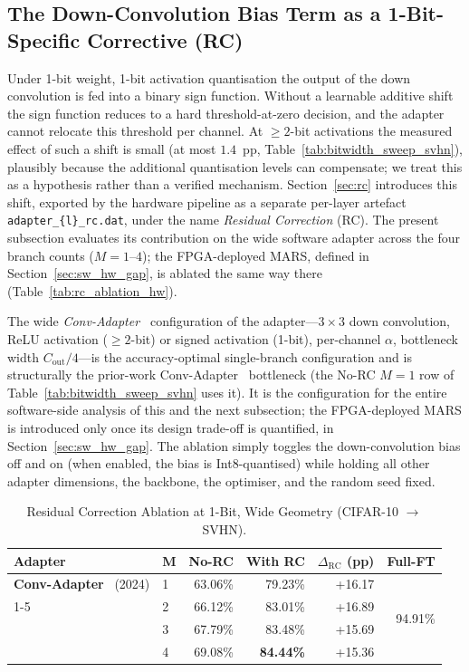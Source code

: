 \documentclass[12pt, a4paper]{report}
\numberwithin{equation}{chapter}
\numberwithin{figure}{chapter}
\numberwithin{table}{chapter}
\numberwithin{algorithm}{chapter}
\begin{document}
\subsection{The Down-Convolution Bias Term as a 1-Bit-Specific Corrective (RC)}
\label{sec:rc_ablation_svhn}

Under 1-bit weight, 1-bit activation quantisation the output of the down convolution is fed into a binary sign function. Without a learnable additive shift the sign function reduces to a hard threshold-at-zero decision, and the adapter cannot relocate this threshold per channel. At $\geq 2$-bit activations the measured effect of such a shift is small (at most $1.4$~pp, Table~\ref{tab:bitwidth_sweep_svhn}), plausibly because the additional quantisation levels can compensate; we treat this as a hypothesis rather than a verified mechanism. Section~\ref{sec:rc} introduces this shift, exported by the hardware pipeline as a separate per-layer artefact \texttt{adapter\_\{l\}\_rc.dat}, under the name \emph{Residual Correction} (RC). The present subsection evaluates its contribution on the wide software adapter across the four branch counts ($M{=}1$--$4$); the FPGA-deployed MARS, defined in Section~\ref{sec:sw_hw_gap}, is ablated the same way there (Table~\ref{tab:rc_ablation_hw}).

The wide \emph{Conv-Adapter~\cite{Chen2024ConvAdapter}} configuration of the adapter---$3\times 3$ down convolution, ReLU activation ($\geq 2$-bit) or signed activation (1-bit), per-channel $\alpha$, bottleneck width $C_{\text{out}}/4$---is the accuracy-optimal single-branch configuration and is structurally the prior-work Conv-Adapter~\cite{Chen2024ConvAdapter} bottleneck (the No-RC $M{=}1$ row of Table~\ref{tab:bitwidth_sweep_svhn} uses it). It is the configuration for the entire software-side analysis of this and the next subsection; the FPGA-deployed MARS is introduced only once its design trade-off is quantified, in Section~\ref{sec:sw_hw_gap}. The ablation simply toggles the down-convolution bias off and on (when enabled, the bias is Int8-quantised) while holding all other adapter dimensions, the backbone, the optimiser, and the random seed fixed.

\begin{table}[H]
\centering
\caption{Residual Correction Ablation at 1-Bit, Wide Geometry (CIFAR-10 $\to$ SVHN).}
\label{tab:rc_ablation_svhn}
\begin{tabular}{llrrrr}
\toprule
\textbf{Adapter} & \textbf{M} & \textbf{No-RC} & \textbf{With RC} & \textbf{$\Delta_{\text{RC}}$ (pp)} & \textbf{Full-FT} \\
\midrule
\textbf{Conv-Adapter}~\cite{Chen2024ConvAdapter} (2024) & 1 & 63.06\% & 79.23\% & +16.17 & \multirow{4}{*}{94.91\%} \\
\cmidrule(lr){1-5}
\multirow{3}{*}{\textbf{MARS}} & 2 & 66.12\% & 83.01\% & +16.89 & \\
 & 3 & 67.79\% & 83.48\% & +15.69 & \\
 & 4 & 69.08\% & \textbf{84.44\%} & +15.36 & \\
\bottomrule
\end{tabular}
\end{table}
\end{document}
